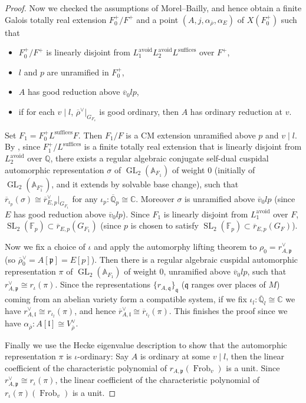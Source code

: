 \documentclass[10pt]{article}
\theoremstyle{definition}
\numberwithin{equation}{theorem}
\newcommand{\AAA}{\mathbb{A}}
\newcommand{\CC}{\mathbb{C}}
\newcommand{\FF}{\mathbb{F}}
\newcommand{\QQ}{\mathbb{Q}}
\newcommand{\gothl}{\mathfrak{l}}
\newcommand{\gothp}{\mathfrak{p}}
\newcommand{\gothq}{\mathfrak{q}}
\DeclareMathOperator{\Frob}{Frob}
\DeclareMathOperator{\GL}{GL}
\DeclareMathOperator{\SL}{SL}
\begin{document}
\begin{proof}
Now we checked the assumptions of Morel--Bailly, and hence obtain a finite Galois totally real extension $F_0^+/F^+$ and a point $(A,j,\alpha_{\overline{\rho}},\alpha_E)$ of $X(F_0^+)$ such that
\begin{itemize}
    \item $F_0^+/F^+$ is linearly disjoint from $L_1^\text{avoid}L_2^\text{avoid}L^\text{suffices}$ over $F^+$,
    \item $l$ and $p$ are unramified in $F_0^+$,
    \item $A$ has good reduction above $\overline{v}_0lp$,
    \item if for each $v\mid l$, $\overline{\rho}^\vee|_{G_{F_v}}$ is good ordinary, then $A$ has ordinary reduction at $v$.
\end{itemize}

Set $F_1=F_0^+L^\text{suffices}F$. Then $F_1/F$ is a CM extension unramified above $p$ and $v\mid l$. By \cite[Theorem~3.2]{AN19}, since $F_1^+/L^\text{suffices}$ is a finite totally real extension that is linearly disjoint from $L_2^\text{avoid}$ over $\QQ$, there exists a regular algebraic conjugate self-dual cuspidal automorphic representation $\sigma$ of $\GL_2(\AAA_{F_1})$ of weight 0 (initially of $\GL_2(\AAA_{F_1^+})$, and it extends by solvable base change), such that $\overline{r}_{\iota_p}(\sigma)\cong\overline{r}_{E,p}^\vee|_{G_{F_1}}$ for any $\iota_p:\overline{\QQ}_p\cong\CC$. Moreover $\sigma$ is unramified above $\overline{v}_0lp$ (since $E$ has good reduction above $\overline{v}_0lp$). Since $F_1$ is linearly disjoint from $L_1^\text{avoid}$ over $F$, $\SL_2(\FF_p)\subset\overline{r}_{E,p}(G_{F_1})$ (since $p$ is chosen to satisfy $\SL_2(\FF_p)\subset\overline{r}_{E,p}(G_F)$).

Now we fix a choice of $\iota$ and apply the automorphy lifting theorem \cite[Theorem~6.1.1]{ACC+18} to $\rho_0=r_{A,\gothp}^\vee$ (so $\overline{\rho}_0^\vee=A[\gothp]=E[p]$). Then there is a regular algebraic cuspidal automorphic representation $\pi$ of $\GL_2(\AAA_{F_1})$ of weight 0, unramified above $\overline{v}_0lp$, such that $r_{A,\gothp}^\vee\cong r_\iota(\pi)$. Since the representations $\{r_{A,\gothq}\}_\gothq$ ($\gothq$ ranges over places of $M$) coming from an abelian variety form a compatible system, if we fix $\iota_l:\overline{\QQ}_l\cong\CC$ we have $r_{A,\gothl}^\vee\cong r_{\iota_l}(\pi)$, and hence $\overline{r}_{A,\gothl}^\vee\cong\overline{r}_{\iota_l}(\pi)$. This finishes the proof since we have $\alpha_{\overline{\rho}}:A[\gothl]\cong V_{\overline{\rho}}^\vee$.

Finally we use the Hecke eigenvalue description to show that the automorphic representation $\pi$ is $\iota$-ordinary: Say $A$ is ordinary at some $v\mid l$, then the linear coefficient of the characteristic polynomial of $r_{A,\gothp}(\Frob_v)$ is a unit. Since $r_{A,\gothp}^\vee\cong r_{\iota}(\pi)$, the linear coefficient of the characteristic polynomial of $r_{\iota}(\pi)(\Frob_v)$ is a unit.
\end{proof}
\end{document}
